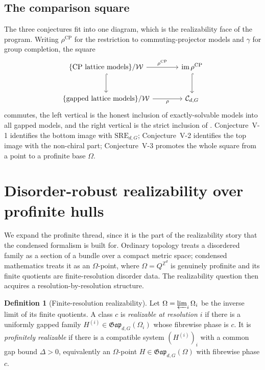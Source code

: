 \documentclass[12pt]{article}
\newcommand{\Gap}{\mathfrak{Gap}}              %
\newcommand{\Weq}{\mathcal{W}}                 %
\newcommand{\gapbound}{\Delta}                  %
\newcommand{\dis}{\Omega}                       %
\newcommand{\real}{\rho}                         %
\newcommand{\SRE}{\mathrm{SRE}}                  %
\newcommand{\CP}{\mathrm{CP}}                    %
\newcommand{\Zint}{\mathbb{Z}}
\newcommand{\im}{\operatorname{im}}
\theoremstyle{definition}
\newtheorem{definition}[theorem]{Definition}
\theoremstyle{remark}
\begin{document}
\subsection{The comparison square}

The three conjectures fit into one diagram, which is the realizability face of the program.
Writing $\real^{\CP}$ for the restriction to commuting-projector models and $\gamma$ for
group completion, the square
\[
\begin{tikzcd}[column sep=large, row sep=large]
\{\text{$\CP$ lattice models}\}/\Weq \arrow[r, "\real^{\CP}"] \arrow[d, hook]
  & \im\real^{\CP} \arrow[d, hook] \\
\{\text{gapped lattice models}\}/\Weq \arrow[r, "\real"']
  & \mathcal{C}_{d,G}
\end{tikzcd}
\]
commutes, the left vertical is the honest inclusion of exactly-solvable models into all
gapped models, and the right vertical is the strict inclusion of .
Conjecture~V-1 identifies the bottom image with $\SRE_{d,G}$; Conjecture~V-2 identifies the
top image with the non-chiral part; Conjecture~V-3 promotes the whole square from a point to a
profinite base $\dis$.

\section{Disorder-robust realizability over profinite hulls}
\label{sec:disorder}

We expand the profinite thread, since it is the part of the realizability story that the
condensed formalism is built for. Ordinary topology treats a disordered family as a section
of a bundle over a compact metric space; condensed mathematics treats it as an $\dis$-point,
where $\dis=Q^{\Zint^d}$ is genuinely profinite and its finite quotients are finite-resolution
disorder data. The realizability question then acquires a resolution-by-resolution structure.

\begin{definition}[Finite-resolution realizability]
\label{def:finres}
Let $\dis=\varprojlim_i\dis_i$ be the inverse limit of its finite quotients. A class $c$ is
\emph{realizable at resolution $i$} if there is a uniformly gapped family
$H^{(i)}\in\Gap_{d,G}(\dis_i)$ whose fibrewise phase is $c$. It is \emph{profinitely
realizable} if there is a compatible system $(H^{(i)})_i$ with a common gap bound
$\gapbound>0$, equivalently an $\dis$-point $H\in\Gap_{d,G}(\dis)$ with fibrewise phase $c$.
\end{definition}
\end{document}
